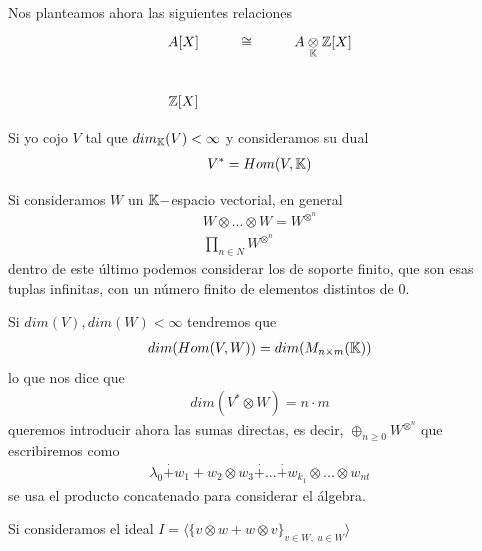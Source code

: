 \begin{ejemplo}
\begin{itemize}

        Nos planteamos ahora las siguientes relaciones
        \begin{gather*}
            \xymatrix{
                A[X] & \cong & A \underset{{\bb{K}}}{\otimes}  \bb{Z}[X]\\
                \bb{Z}[X]
            }
        \end{gather*}


        Si yo cojo $V$ tal que $dim_{\mathbb{K}}(V)<\infty$ y consideramos su dual
        \begin{gather*}
            V^* = Hom(V, \mathbb{K})
        \end{gather*}
    \end{itemize}
\end{ejemplo}




Si consideramos $W$ un $\mathbb{K}-$espacio vectorial, en general
\begin{gather*}
    W \otimes ... \otimes W = W^{\otimes^n}\\
    \prod_{n\in N} W^{\otimes^n}
\end{gather*}
dentro de este último podemos considerar los de soporte finito, que son esas tuplas infinitas, con un número finito de elementos distintos de $0$.

Si $dim(V), dim(W) < \infty$ tendremos que 
\begin{gather*}
    dim(Hom(V,W)) = dim(M_{n\times m}(\mathbb{K}))
\end{gather*}
lo que nos dice que 
\begin{gather*}
    dim(V^*\otimes W) = n\cdot m
\end{gather*}
queremos introducir ahora las sumas directas, es decir, $\oplus_{n\geq 0} W^{\otimes^n}$ que escribiremos como
\begin{gather*}
    \lambda_0 \overset{\cdot}{+} w_1 + w_2 \otimes w_3 \overset{\cdot}{+} ... \overset{\cdot}{+} w_{k_1} \otimes ... \otimes w_{nt}
\end{gather*}
se usa el producto concatenado para considerar el álgebra.

Si consideramos el ideal $I = \langle \{ v \otimes w + w \otimes v \}_{v\in W,\ u\in W} \rangle$

